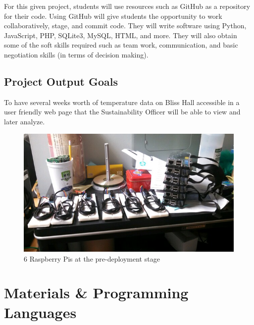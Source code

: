\documentclass{article}
\begin{document}
			For this given project, students will use resources such as GitHub as a repository for their code. Using GitHub will
			give students the opportunity to work collaboratively, stage, and commit code. They will write software using 
			Python, JavaScript, PHP, SQLite3, MySQL, HTML, and more. They will also obtain some of the soft skills required such
			as team work, communication, and basic negotiation skills (in terms of decision making).
		\subsection{Project Output Goals}
			To have several weeks worth of temperature data on Bliss Hall accessible in a user friendly web page that the
			Sustainability Officer will be able to view and later analyze.\\	
		
		\begin{figure}[H]
  			\begin{center}	
				\includegraphics[scale=.5]{pre_deployment.jpg}
			\end{center}
  				\captionsetup{labelformat=empty}
  				\caption{6 Raspberry Pis at the pre-deployment stage}
  		\end{figure}			
			
		
	\newpage	
	\section{Materials \& Programming Languages}\label{sec:materials}
\end{document}
